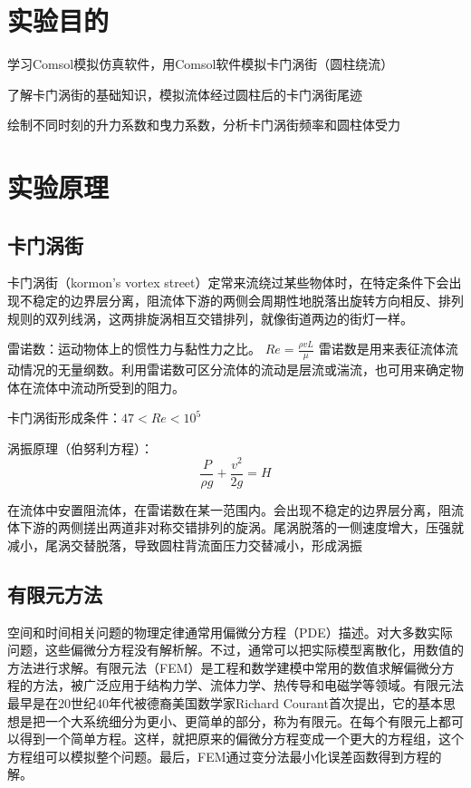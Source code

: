 \documentclass[a4paper,zihao=5,UTF8,fontset=fandol]{phyreport}
\begin{document}
\phyExpCover
\section{实验目的}
学习Comsol模拟仿真软件，用Comsol软件模拟卡门涡街（圆柱绕流）

了解卡门涡街的基础知识，模拟流体经过圆柱后的卡门涡街尾迹

绘制不同时刻的升力系数和曳力系数，分析卡门涡街频率和圆柱体受力

\longLine
\section{实验原理}
\subsection{卡门涡街}
卡门涡街（kormon's vortex street）定常来流绕过某些物体时，在特定条件下会出现不稳定的边界层分离，阻流体下游的两侧会周期性地脱落出旋转方向相反、排列规则的双列线涡，这两排旋涡相互交错排列，就像街道两边的街灯一样。

雷诺数：运动物体上的惯性力与黏性力之比。
$Re = \frac{\rho vL}{\mu}$
雷诺数是用来表征流体流动情况的无量纲数。利用雷诺数可区分流体的流动是层流或湍流，也可用来确定物体在流体中流动所受到的阻力。


卡门涡街形成条件：$47<Re<10^5$

涡振原理（伯努利方程）：
\begin{equation}
  \frac{P}{\rho g}+\frac{v^2}{2g}=H  
  \label{eq:bernoulli}
\end{equation}

在流体中安置阻流体，在雷诺数在某一范围内。会出现不稳定的边界层分离，阻流体下游的两侧搓出两道非对称交错排列的旋涡。尾涡脱落的一侧速度增大，压强就减小，尾涡交替脱落，导致圆柱背流面压力交替减小，形成涡振

\subsection{有限元方法}
空间和时间相关问题的物理定律通常用偏微分方程（PDE）描述。对大多数实际问题，这些偏微分方程没有解析解。不过，通常可以把实际模型离散化，用数值的方法进行求解。有限元法（FEM）是工程和数学建模中常用的数值求解偏微分方程的方法，被广泛应用于结构力学、流体力学、热传导和电磁学等领域。有限元法最早是在20世纪40年代被德裔美国数学家Richard Courant首次提出，它的基本思想是把一个大系统细分为更小、更简单的部分，称为有限元。在每个有限元上都可以得到一个简单方程。这样，就把原来的偏微分方程变成一个更大的方程组，这个方程组可以模拟整个问题。最后，FEM通过变分法最小化误差函数得到方程的解。
\end{document}
